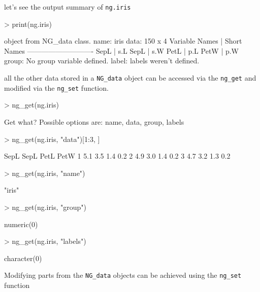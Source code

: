 \documentclass[12pt,oneside,titlepage,letter]{article}
\begin{document}
let's see the output summary of \texttt{ng.iris}

\begin{Schunk}
\begin{Sinput}
> print(ng.iris)
\end{Sinput}
\begin{Soutput}
object from NG_data class.
  name: iris 
  data: 150 x 4 
    Variable Names | Short Names
    ----------------------------
    SepL           | s.L
    SepL           | s.W
    PetL           | p.L
    PetW           | p.W
  group:  No group variable defined.
  label: labels weren't defined.
\end{Soutput}
\end{Schunk}

all the other data stored in a \texttt{NG\_data} object can be accessed via the \texttt{ng\_get} and modified via the \texttt{ng\_set} function.

\begin{Schunk}
\begin{Sinput}
> ng_get(ng.iris)
\end{Sinput}
\begin{Soutput}
Get what? Possible options are: name, data, group, labels
\end{Soutput}
\begin{Sinput}
> ng_get(ng.iris, "data")[1:3, ]
\end{Sinput}
\begin{Soutput}
  SepL SepL PetL PetW
1  5.1  3.5  1.4  0.2
2  4.9  3.0  1.4  0.2
3  4.7  3.2  1.3  0.2
\end{Soutput}
\begin{Sinput}
> ng_get(ng.iris, "name")
\end{Sinput}
\begin{Soutput}
[1] "iris"
\end{Soutput}
\begin{Sinput}
> ng_get(ng.iris, "group")
\end{Sinput}
\begin{Soutput}
numeric(0)
\end{Soutput}
\begin{Sinput}
> ng_get(ng.iris, "labels")
\end{Sinput}
\begin{Soutput}
character(0)
\end{Soutput}
\end{Schunk}

Modifying parts from the \texttt{NG\_data} objects can be achieved using the \texttt{ng\_set} function
\end{document}
